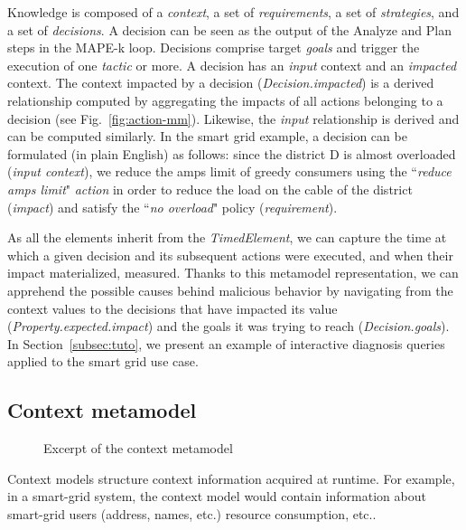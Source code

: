 Knowledge is composed of a \textit{context}, a set of \textit{requirements}, a set of \textit{strategies}, and a set of \textit{decisions}.  A decision can be seen as the output of the Analyze and Plan steps in the MAPE-k loop. Decisions comprise target \textit{goals} and trigger the execution of one \textit{tactic} or more.  A decision has an \textit{input} context and an \textit{impacted} context.  The context impacted by a decision  (\textit{Decision.impacted}) is a derived relationship computed by aggregating the impacts of all actions belonging to a decision (see Fig.~\ref{fig:action-mm}).  Likewise, the \textit{input} relationship is derived and can be computed similarly. In the smart grid example, a decision can be formulated (in plain English) as follows: since the district D is almost overloaded (\textit{input context}), we reduce the amps limit of greedy consumers using the ``\textit{reduce amps limit}" \textit{action} in order to reduce the load on the cable of the district (\textit{impact}) and satisfy the ``\textit{no overload}" policy (\textit{requirement}).

As all the elements inherit from the \textit{TimedElement}, we can capture the time at which a given decision and its subsequent actions were executed, and when their impact materialized, \ie measured. Thanks to this metamodel representation, we can apprehend the possible causes behind malicious behavior by navigating from the context values to the decisions that have impacted its value (\textit{Property.expected.impact}) and the goals it was trying to reach (\textit{Decision.goals}). In Section~\ref{subsec:tuto}, we present an example of interactive diagnosis queries applied to the smart grid use case.

\subsection{Context metamodel}
\begin{figure}
  \begin{center}
      \caption{Excerpt of the context metamodel}
      \label{fig:context-model}
  \end{center}	
\end{figure}

Context models structure context information acquired at runtime. 
For example, in a smart-grid system, the context model would contain information about smart-grid users (address, names, etc.) resource consumption, etc..

